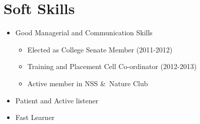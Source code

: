 \documentclass[11pt,a4paper,sans]{moderncv} %
\begin{document}
\begin{comment}
\section{Masters Thesis}

\cvitem{Title}{\emph{Money Is The Root Of All Evil -- Or Is It?}}
\cvitem{Supervisors}{Professor James Smith \& Associate Professor Jane Smith}
\cvitem{Description}{This thesis explored the idea that money has been the cause of untold anguish and suffering in the world. I found that it has, in fact, not.}
\end{comment}



\section{\textbf{Soft Skills}}
		
\cvitem{}
{
\begin{itemize}
	\item Good Managerial and Communication Skills
	\begin{itemize}
		\item Elected as College Senate Member (2011-2012)
		\item Training and Placement Cell Co-ordinator (2012-2013)
		\item Active member in NSS \&\  Nature Club
	\end{itemize}
		\item Patient and Active listener
		\item Fast Learner
\end{itemize}
}


\begin{comment}
\section{Languages}

\cvitemwithcomment{Malayalam}{Mother tongue}{}
\cvitemwithcomment{English}{Mother tongue}{}

\cvitemwithcomment{Spanish}{Intermediate}{Conversationally fluent}
\cvitemwithcomment{Dutch}{Basic}{Basic words and phrases only}
\end{comment}
\end{document}
